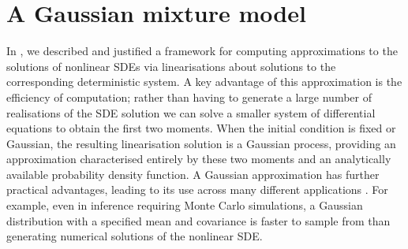 \chapter{A Gaussian mixture model}\label{ch:gmm}
In , we described and justified a framework for computing approximations to the solutions of nonlinear SDEs via linearisations about solutions to the corresponding deterministic system.
A key advantage of this approximation is the efficiency of computation; rather than having to generate a large number of realisations of the SDE solution we can solve a smaller system of differential equations to obtain the first two moments.
When the initial condition is fixed or Gaussian, the resulting linearisation solution is a Gaussian process, providing an approximation characterised entirely by these two moments and an analytically available probability density function.
A Gaussian approximation has further practical advantages, leading to its use across many different applications \citep{KaszasHaller_2020_UniversalUpperEstimate,ArchambeauEtAl_2007_GaussianProcessApproximations,Jazwinski_2014_StochasticProcessesFiltering,SarkkaSolin_2019_AppliedStochasticDifferential,Sanz-AlonsoStuart_2017_GaussianApproximationsSmall}.
For example, even in inference requiring Monte Carlo simulations, a Gaussian distribution with a specified mean and covariance is faster to sample from than generating numerical solutions of the nonlinear SDE.

